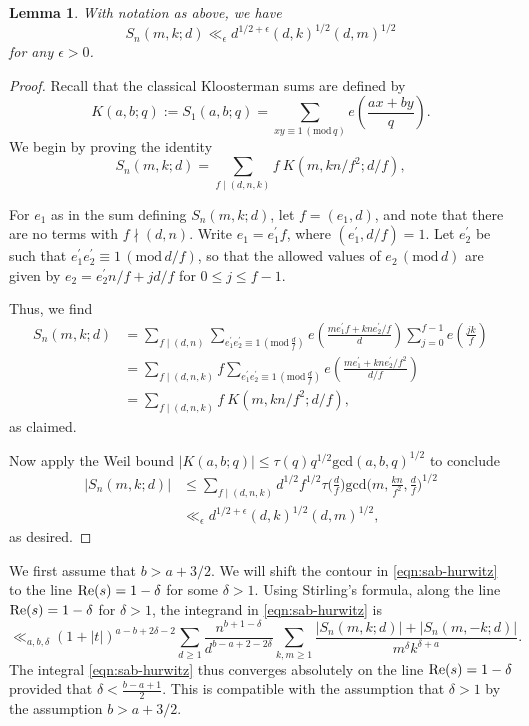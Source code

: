 \documentclass[12pt]{amsart}
\newtheorem{lemma}[theorem]{Lemma}
\numberwithin{equation}{section}
\numberwithin{theorem}{section}
\renewcommand\Re{\textnormal{Re}}
\renewcommand{\pmod}[1]{\,\left(\mathrm{mod}\,#1\right)}
\begin{document}
\begin{lemma}\label{lem:kloosterman}
With notation as above, we have
\[
S_n(m,k;d) \ll_\epsilon d^{1/2+\epsilon} (d,k)^{1/2} (d,m)^{1/2}\]
for any $\epsilon > 0$.
\end{lemma}
\begin{proof}
Recall that the classical Kloosterman sums are defined by
\[
	K(a,b;q) := S_1(a,b;q) = \sum_{ xy \equiv 1 \pmod{q}} e\left(\frac{ax+by}{q}\right).
\]
We begin by proving the identity
\[
	S_n(m,k;d)
		= \sum_{f \mid (d,n,k)} f ~K(m, kn/f^2; d/f),
\]

For $e_1$ as in the sum defining $S_n(m,k;d)$, let $f = (e_1,d)$, and note that there are no terms with $f \nmid (d,n)$.  Write $e_1 = e_1^\prime f$, where $(e_1^\prime, d/f) = 1$.  Let $e_2^\prime$ be such that $e_1^\prime e_2^\prime \equiv 1\pmod{d/f}$, so that the allowed values of $e_2 \pmod{d}$ are given by $e_2 = e_2^\prime n/f + jd/f$ for $0 \leq j \leq f-1$.

Thus, we find
\begin{align*}
S_n(m,k;d)
	&= \sum_{f \mid (d,n)} \sum_{e_1^\prime e_2^\prime \equiv 1 \pmod{\frac{d}{f}}} e\left(\frac{m e_1^\prime f + kne_2^\prime/f}{d}\right)\sum_{j=0}^{f-1} e\left(\frac{jk}{f}\right) \\
	&= \sum_{f \mid (d,n,k)} f \sum_{e_1^\prime e_2^\prime \equiv 1 \pmod{\frac{d}{f}}} e\left(\frac{me_1^\prime + kne_2^\prime /f^2}{d/f}\right) \\
	&= \sum_{f \mid (d,n,k)} f ~K(m,kn/f^2;d/f),
\end{align*}
as claimed.

Now apply the Weil bound $|K(a,b;q)| \leq \tau(q)q^{1/2}\mathrm{gcd}(a,b,q)^{1/2}$ to conclude
\begin{align*}
|S_n(m,k;d)|
	&\leq  \sum_{f \mid (d,n,k)} d^{1/2} f^{1/2} \tau\Big(\frac{d}{f}\Big) \mathrm{gcd}\Big(m,\frac{kn}{f^2},\frac{d}{f}\Big)^{1/2} \\
	&\ll_\epsilon d^{1/2+\epsilon} (d,k)^{1/2} (d,m)^{1/2},
\end{align*}
as desired.
\end{proof}

We first assume that $b > a + 3/2$.  We will shift the contour in \eqref{eqn:sab-hurwitz} to the line $\Re(s)=1-\delta$ for some $\delta > 1$.  Using Stirling's formula, along the line $\Re(s)=1-\delta$ for $\delta>1$, the integrand in \eqref{eqn:sab-hurwitz} is
\[
	\ll_{a,b,\delta} (1+|t|)^{a-b+2\delta-2}\sum_{d \geq 1} \frac{n^{b+1-\delta}}{d^{b-a+2-2\delta}} \sum_{k,m\geq 1} \frac{|S_n(m,k;d)|+|S_n(m,-k;d)|}{m^\delta k^{\delta + a}}. 
\]
The integral \eqref{eqn:sab-hurwitz} thus converges absolutely on the line $\Re(s)=1-\delta$ provided that $\delta < \frac{b-a+1}{2}$.  This is compatible with the assumption that $\delta>1$ by the assumption $b>a+3/2$.
\end{document}
